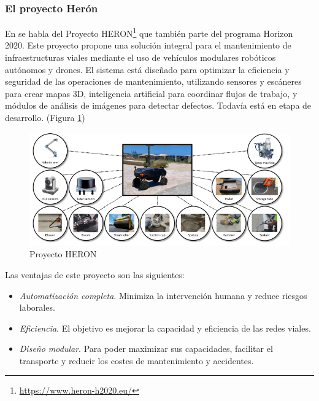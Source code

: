 \subsubsection{El proyecto Herón}
\label{subsubsec:sistema2}

En \cite{10.1145/3529190.3534746} se habla del Proyecto HERON\footnote{\url{https://www.heron-h2020.eu/}} que también parte del programa Horizon 2020. Este proyecto propone una solución integral para el mantenimiento de infraestructuras viales mediante el uso de vehículos modulares robóticos autónomos y drones. El sistema está diseñado para optimizar la eficiencia y seguridad de las operaciones de mantenimiento, utilizando sensores y escáneres para crear mapas 3D, inteligencia artificial para coordinar flujos de trabajo, y módulos de análisis de imágenes para detectar defectos. Todavía está en etapa de desarrollo. (Figura \ref{fig:heron})

\begin{figure} [h!]
	\begin{center}
		\includegraphics[width=15cm]{figs/heron.png}
	\end{center}
	\caption{Proyecto HERON}
	\label{fig:heron}
\end{figure}

Las ventajas de este proyecto son las siguientes:

\begin{itemize}
	\item \textit{Automatización completa}. Minimiza la intervención humana y reduce riesgos laborales.
	\item \textit{Eficiencia}. El objetivo es mejorar la capacidad y eficiencia de las redes viales.
	\item \textit{Diseño modular}. Para poder maximizar sus capacidades, facilitar el transporte y reducir los costes de mantenimiento y accidentes.
\end{itemize}

